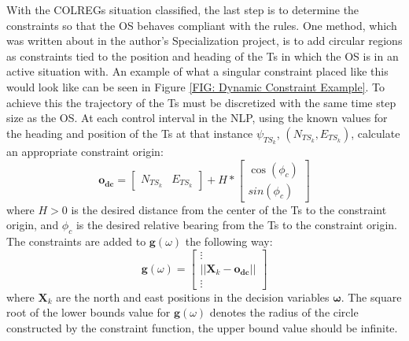 With the \gls{COLREGs} situation classified, the last step is to determine the constraints so that the \gls{OS} behaves compliant with the rules.
One method, which was written about in the author's Specialization project, is to add circular regions as constraints tied to the position and heading
of the \gls{Ts} in which the \gls{OS} is in an active situation with. An example of what a singular constraint placed like this would look like
can be seen in Figure \ref{FIG: Dynamic Constraint Example}. To achieve this the trajectory of the \gls{Ts} must be discretized with the same
time step size as the \gls{OS}. At each control interval in the \gls{NLP}, using the known values for the heading 
and position of the \gls{Ts} at that instance $\psi_{TS_{k}}$, $(N_{TS_{k}}, E_{TS_{k}})$, calculate an appropriate constraint origin:
\begin{equation}
    \mathbf{o_{dc}} = \begin{bmatrix}
        N_{TS_{k}} & E_{TS_{k}}
                    \end{bmatrix} + H * \begin{bmatrix}
                                        \cos(\phi_c) \\
                                        sin(\phi_c)
                                        \end{bmatrix}
\end{equation}
where $H>0$ is the desired distance from the center of the \gls{Ts} to the constraint origin, and $\phi_c$ is the desired relative
bearing from the \gls{Ts} to the constraint origin. The constraints are added to $\textbf{g}(\omega)$ the following way:
\begin{equation} \label{EQ: dynamic constraint in g}
    \textbf{g}(\omega) = \begin{bmatrix}
        \vdots \\
        ||\textbf{X}_k - \mathbf{o_{dc}}||\\
        \vdots
    \end{bmatrix}
\end{equation}
where $\textbf{X}_k$ are the north and east positions in the decision variables $\bm{\omega}$. The square root of the lower bounds value
for $\textbf{g}(\omega)$ denotes the radius of the circle constructed by the constraint function, the upper bound value should be infinite.

